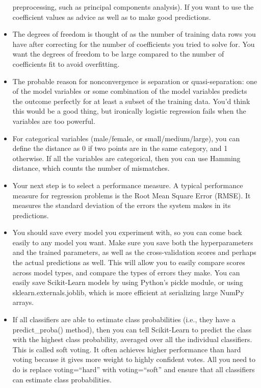 \documentclass[]{book}
\begin{document}
\begin{itemize}
  preprocessing, such as principal components analysis). If you want to
  use the coefficient values as advice as well as to make good
  predictions.
\item
  The degrees of freedom is thought of as the number of training data
  rows you have after correcting for the number of coefficients you
  tried to solve for. You want the degrees of freedom to be large
  compared to the number of coefficients fit to avoid overfitting.
\item
  The probable reason for nonconvergence is separation or
  quasi-separation: one of the model variables or some combination of
  the model variables predicts the outcome perfectly for at least a
  subset of the training data. You'd think this would be a good thing,
  but ironically logistic regression fails when the variables are too
  powerful.
\item
  For categorical variables (male/female, or small/medium/large), you
  can define the distance as 0 if two points are in the same category,
  and 1 otherwise. If all the variables are categorical, then you can
  use Hamming distance, which counts the number of mismatches.
\item
  Your next step is to select a performance measure. A typical
  performance measure for regression problems is the Root Mean Square
  Error (RMSE). It measures the standard deviation of the errors the
  system makes in its predictions.
\item
  You should save every model you experiment with, so you can come back
  easily to any model you want. Make sure you save both the
  hyperparameters and the trained parameters, as well as the
  cross-validation scores and perhaps the actual predictions as well.
  This will allow you to easily compare scores across model types, and
  compare the types of errors they make. You can easily save
  Scikit-Learn models by using Python's pickle module, or using
  sklearn.externals.joblib, which is more efficient at serializing large
  NumPy arrays.
\item
  If all classifiers are able to estimate class probabilities (i.e.,
  they have a predict\_proba() method), then you can tell Scikit-Learn
  to predict the class with the highest class probability, averaged over
  all the individual classifiers. This is called soft voting. It often
  achieves higher performance than hard voting because it gives more
  weight to highly confident votes. All you need to do is replace
  voting=``hard'' with voting=``soft'' and ensure that all classifiers
  can estimate class probabilities.

\end{itemize}
\end{document}
